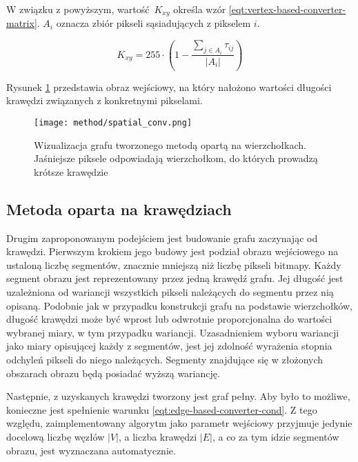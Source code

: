{{{            W związku z powyższym, wartość $K_{xy}$ określa wzór \ref{eqt:vertex-based-converter-matrix}. $A_i$ oznacza
            zbiór pikseli sąsiadujących z pikselem $i$.

            \begin{equation}\label{eqt:vertex-based-converter-matrix}
                K_{xy} = 255 \cdot (1 - \frac{\sum_{j \in A_i} \tau_{ij}}{|A_i|})
            \end{equation}

            Rysunek \ref{fig:method-vis-vertex} przedstawia obraz wejściowy, na który nałożono wartości długości
            krawędzi związanych z konkretnymi pikselami.

            \begin{figure}
                \centering
                \texttt{[image: method/spatial\_conv.png]}
                \caption{Wizualizacja grafu tworzonego metodą opartą na wierzchołkach. Jaśniejsze piksele odpowiadają wierzchołkom, do których prowadzą krótsze krawędzie}
                \label{fig:method-vis-vertex}
            \end{figure}
        }

        \subsection{Metoda oparta na krawędziach}\label{subsec:edge-method}
        {
            Drugim zaproponowanym podejściem jest budowanie grafu zaczynając od krawędzi. Pierwszym krokiem jego budowy
            jest podział obrazu wejściowego na ustaloną liczbę segmentów, znacznie mniejszą niż liczbę pikseli
            bitmapy. Każdy segment obrazu jest reprezentowany przez jedną krawędź grafu. Jej długość jest uzależniona od
            wariancji wszystkich pikseli należących do segmentu przez nią opisaną. Podobnie jak w przypadku konstrukcji
            grafu na podstawie wierzchołków, długość krawędzi może być wprost lub odwrotnie proporcjonalna do wartości
            wybranej miary, w tym przypadku wariancji. Uzasadnieniem wyboru wariancji jako miary opisującej każdy z
            segmentów, jest jej zdolność wyrażenia stopnia odchyleń pikseli do niego należących. Segmenty znajdujące się
            w złożonych obszarach obrazu będą posiadać wyższą wariancję.

            Następnie, z uzyskanych krawędzi tworzony jest graf pełny. Aby było to możliwe, konieczne jest spełnienie
            warunku \ref{eqt:edge-based-converter-cond}. Z tego względu, zaimplementowany algorytm jako parametr
            wejściowy przyjmuje jedynie docelową liczbę węzłów $|V|$, a liczba krawędzi $|E|$, a co za tym idzie
            segmentów obrazu, jest wyznaczana automatycznie.

}}}
